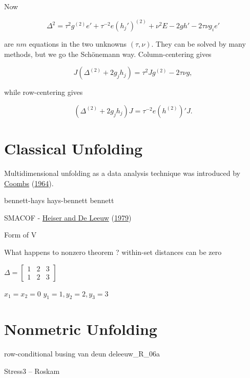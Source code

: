 \documentclass[
  12pt,
]{book}
\theoremstyle{definition}
\theoremstyle{definition}
\theoremstyle{definition}
\theoremstyle{definition}
\theoremstyle{remark}
\begin{document}
Now

\begin{equation}
\Delta^2=\tau^2 g^{(2)}e'+\tau^{-2}e(h_j')^{(2)}+\nu^2E-2gh'-2\tau\nu g_ie'
\label{eq:schone}
\end{equation}

are \(nm\) equations in the two unknowns \((\tau,\nu)\). They can be solved by many methods, but we go the Schönemann way. Column-centering gives

\begin{equation}
J(\Delta^{(2)}+2g_jh_j)=\tau^2 Jg^{(2)}-2\tau\nu g,
\label{eq:schonecol}
\end{equation}

while row-centering gives

\begin{equation}
(\Delta^{(2)}+2g_jh_j)J=\tau^{-2}e(h^{(2)})'J.
\label{eq:schonerow}
\end{equation}

\hypertarget{classical-unfolding}{%
\section{Classical Unfolding}\label{classical-unfolding}}

Multidimensional unfolding as a data analysis technique was introduced by \protect\hyperlink{ref-coombs_64}{Coombs} (\protect\hyperlink{ref-coombs_64}{1964}).

bennett-hays
hays-bennett
bennett

SMACOF - \protect\hyperlink{ref-heiser_deleeuw_A_79}{Heiser and De Leeuw} (\protect\hyperlink{ref-heiser_deleeuw_A_79}{1979})

Form of V

What happens to nonzero theorem ? within-set distances can be zero

\(\Delta=\begin{bmatrix}1&2&3\\1&2&3\end{bmatrix}\)

\(x_1=x_2=0\) \(y_1=1,y_2=2,y_3=3\)

\hypertarget{nonmetric-unfolding}{%
\section{Nonmetric Unfolding}\label{nonmetric-unfolding}}

row-conditional
busing
van deun
deleeuw\_R\_06a

Stress3 -- Roskam
\end{document}
